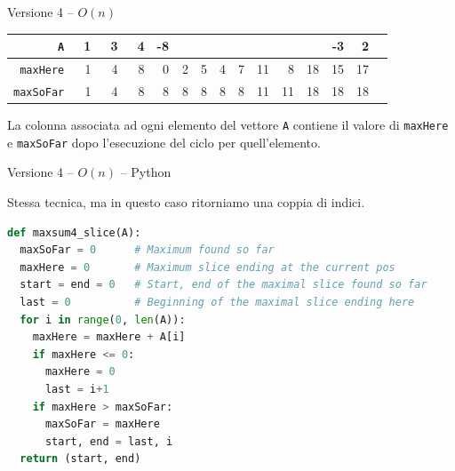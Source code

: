 \begin{frame}[fragile]{Versione 4  -- $O(n)$}

\begingroup
\small
\begin{tabular}{|r|r|r|r|r|r|r|r|r|r|r|r|r|r|r|}
\hline
       \texttt{A} & ~1 & ~3 & ~4 & -8 & ~\cellcolor{red!30}{2} & \cellcolor{red!30}{~3} & \cellcolor{red!30}{-1} & \cellcolor{red!30}{~3} & \cellcolor{red!30}{~4} & \cellcolor{red!30}{-3} & \cellcolor{red!30}{10} & -3 &  2 \\\hline\hline
 \texttt{maxHere} & 1 & 4 & 8 &  0 & 2 & 5 &  4 & 7 & 11 &  8 & 18 & 15 & 17 \\\hline
\texttt{maxSoFar} & 1 & 4 & 8 &  8 & 8 & 8 &  8 & 8 & 11 & 11 & 18 & 18 & 18 \\\hline
\end{tabular}

\endgroup

\bigskip
La colonna associata ad ogni elemento del vettore \texttt{A} contiene il valore
di \texttt{maxHere} e \texttt{maxSoFar} dopo l'esecuzione del ciclo
per quell'elemento.

\end{frame}

\begin{frame}[fragile]{Versione 4  -- $O(n)$ -- Python}

\vspace{-6pt}
\begin{mdframed}[style=mybox]
Stessa tecnica, ma in questo caso ritorniamo una coppia di indici.
\end{mdframed}

\small
\begin{lstlisting}[language=python]
def maxsum4_slice(A):
  maxSoFar = 0      # Maximum found so far
  maxHere = 0       # Maximum slice ending at the current pos
  start = end = 0   # Start, end of the maximal slice found so far
  last = 0          # Beginning of the maximal slice ending here
  for i in range(0, len(A)):
    maxHere = maxHere + A[i]
    if maxHere <= 0:
      maxHere = 0
      last = i+1 
    if maxHere > maxSoFar:
      maxSoFar = maxHere
      start, end = last, i
  return (start, end)
\end{lstlisting}  
  
\end{frame}  

